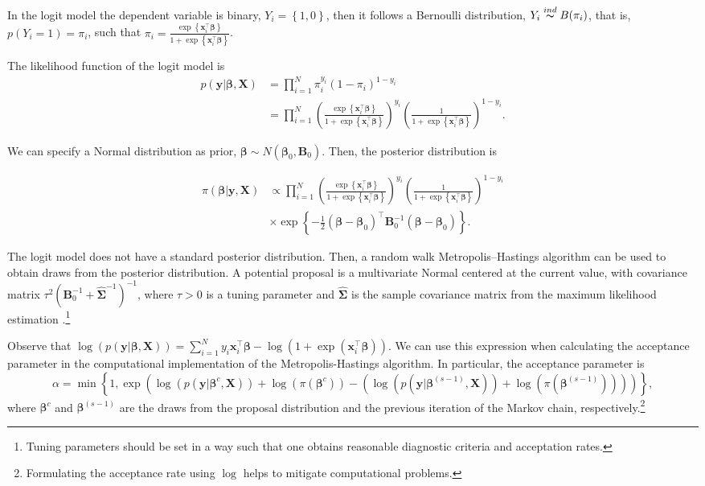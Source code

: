In the logit model the dependent variable is binary, $Y_i=\left\{1,0\right\}$, then it follows a Bernoulli distribution, $Y_i\stackrel{ind} {\thicksim}B(\pi_i)$, that is, $p(Y_i=1)=\pi_i$, such that $\pi_i=\frac{\exp\left\{{\bm{x}}_i^{\top}\bm{\beta}\right\}}{1+\exp\left\{{\bm{x}}_i^{\top}\bm{\beta}\right\}}$.

The likelihood function of the logit model is
\begin{align*}
	p({\bm{y}}|\bm{\beta},{\bm{X}})&=\prod_{i=1}^N \pi_i^{y_i}(1-\pi_i)^{1-y_i}\\
	&=\prod_{i=1}^N\left(\frac{\exp\left\{{\bm{x}}_i^{\top}\bm{\beta}\right\}}{1+\exp\left\{{\bm{x}}_i^{\top}\bm{\beta}\right\}}\right)^{y_i}\left(\frac{1}{1+\exp\left\{{\bm{x}}_i^{\top}\bm{\beta}\right\}}\right)^{1-y_i}.
\end{align*}

We can specify a Normal distribution as prior, $\bm{\beta}\sim N({\bm{\beta}}_0,{\bm{B}}_0)$. Then, the posterior distribution is

\begin{align*}
	\pi(\bm{\beta}|{\bm{y}},{\bm{X}})&\propto\prod_{i=1}^N\left(\frac{\exp\left\{{\bm{x}}_i^{\top}\bm{\beta}\right\}}{1+\exp\left\{{\bm{x}}_i^{\top}\bm{\beta}\right\}}\right)^{y_i}\left(\frac{1}{1+\exp\left\{{\bm{x}}_i^{\top}\bm{\beta}\right\}}\right)^{1-y_i}\\
	&\times\exp\left\{-\frac{1}{2}(\bm{\beta}-\bm{\beta}_0)^{\top}\bm{B}_0^{-1}(\bm{\beta}-\bm{\beta}_0)\right\}.
\end{align*}

The logit model does not have a standard posterior distribution. Then, a random walk Metropolis--Hastings algorithm can be used to obtain draws from the posterior distribution. A potential proposal is a multivariate Normal centered at the current value, with covariance matrix $\tau^2({\bm{B}}_0^{-1}+\widehat{{\bm{\Sigma}}}^{-1})^{-1}$, where $\tau>0$ is a tuning parameter and $\widehat{\bm{\Sigma}}$ is the sample covariance matrix from the maximum likelihood estimation \cite{Martin2011}.\footnote{Tuning parameters should be set in a way such that one obtains reasonable diagnostic criteria and acceptation rates.}

Observe that $\log(p({\bm{y}}|\bm{\beta},{\bm{X}}))=\sum_{i=1}^Ny_i{\bm{x}}_i^{\top}\bm{\beta}-\log(1+\exp({\bm{x}}_i^{\top}\bm{\beta}))$. We can use this expression when calculating the acceptance parameter in the computational implementation of the Metropolis-Hastings algorithm. In particular, the acceptance parameter is \begin{equation*}
	\alpha=\min\left\{1, \exp(\log(p({\bm{y}}|\bm{\beta}^{c},{\bm{X}}))+\log(\pi(\bm{\beta}^c))-(\log(p({\bm{y}}|\bm{\beta}^{(s-1)},{\bm{X}}))+\log(\pi(\bm{\beta}^{(s-1)}))))\right\},
\end{equation*}
where $\bm{\beta}^c$ and $\bm{\beta}^{(s-1)}$ are the draws from the proposal distribution and the previous iteration of the Markov chain, respectively.\footnote{Formulating the acceptance rate using $\log$ helps to mitigate computational problems.}\\

